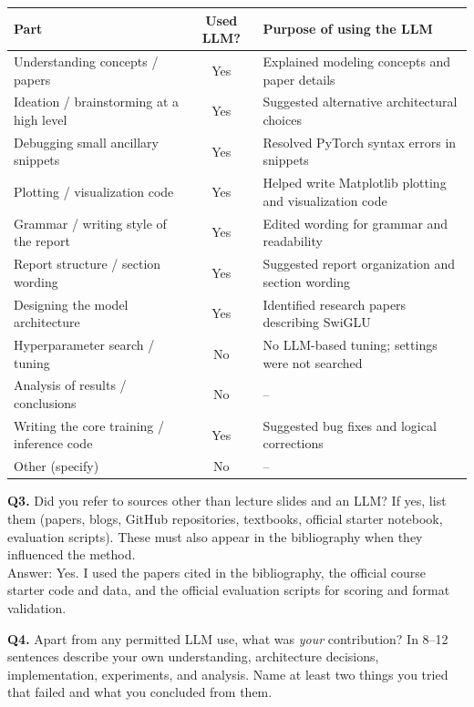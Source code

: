 \documentclass[11pt, oneside]{article}
\begin{document}
\begin{table}[H]
\centering
\begin{tabular}{>{\raggedright\arraybackslash}p{4.6cm}|c|>{\raggedright\arraybackslash}p{7.2cm}}
\toprule
Part & Used LLM? & Purpose of using the LLM \\
\midrule
Understanding concepts / papers & Yes & Explained modeling concepts and paper details\\
Ideation / brainstorming at a high level & Yes & Suggested alternative architectural choices\\
Debugging small ancillary snippets & Yes & Resolved PyTorch syntax errors in snippets\\
Plotting / visualization code & Yes & Helped write Matplotlib plotting and visualization code\\
Grammar / writing style of the report & Yes & Edited wording for grammar and readability\\
Report structure / section wording & Yes & Suggested report organization and section wording\\
Designing the model architecture & Yes & Identified research papers describing SwiGLU\\
Hyperparameter search / tuning & No & No LLM-based tuning; settings were not searched\\
Analysis of results / conclusions & No & --\\
Writing the core training / inference code & Yes & Suggested bug fixes and logical corrections\\
Other (specify) & No & --\\
\bottomrule
\end{tabular}
\end{table}

\medskip
\noindent
\textbf{Q3.} Did you refer to sources other than lecture slides and an LLM?
If yes, list them (papers, blogs, GitHub repositories, textbooks, official starter notebook, evaluation scripts). These must also appear in the bibliography when they influenced the method. \\[0.4em]
Answer: Yes. I used the papers cited in the bibliography, the official course starter code and data, and the
official evaluation scripts for scoring and format validation.

\medskip
\noindent
\textbf{Q4.} Apart from any permitted LLM use, what was \emph{your} contribution? In 8--12 sentences describe your own understanding, architecture decisions, implementation, experiments, and analysis. Name at least two things you tried that failed and what you concluded from them.
\end{document}
